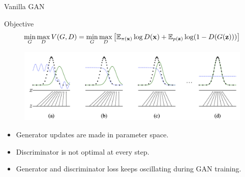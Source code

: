 \begin{frame}{Vanilla GAN}
	\begin{block}{Objective}
		\vspace{-0.4cm}
		\[
		\min_{G} \max_D V(G, D) = \min_{G} \max_D \left[ \mathbb{E}_{\pi(\mathbf{x})} \log D(\mathbf{x}) + \mathbb{E}_{p(\mathbf{z})} \log (1 - D(G(\mathbf{z}))) \right]
		\]
		\vspace{-0.4cm}
	\end{block}

	\begin{figure}
		\centering
		\includegraphics[width=1.0\linewidth]{figs/gan_1}
	\end{figure}
	\begin{itemize}
		\item Generator updates are made in parameter space.
		\item Discriminator is not optimal at every step.
		\item Generator and discriminator loss keeps oscillating during GAN training.
	\end{itemize}

\end{frame}
